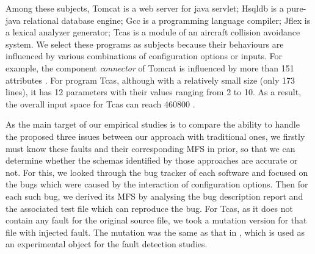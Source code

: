 \documentclass[journal,12pt,onecolumn,draftclsnofoot,]{IEEEtran}
\begin{document}
Among these subjects, Tomcat is a web server for java servlet; Hsqldb is a pure-java relational database engine; Gcc is a programming language compiler; Jflex is a lexical analyzer generator; Tcas is a module of an aircraft collision avoidance system. We select these programs as subjects because their behaviours are influenced by various combinations of configuration options or inputs. For example, the component \emph{connector} of Tomcat is influenced by more than 151 attributes \cite{tomcatconnector}. For program Tcas, although with a relatively small size (only 173 lines), it has 12 parameters with their values ranging from 2 to 10. As a result, the overall input space for Tcas can reach 460800 \cite{shakya2012isolating,kuhn2006pseudo}.


As the main target of our empirical studies is to compare the ability to handle the proposed three issues between our approach with traditional ones, we firstly must know these faults and their corresponding MFS in prior, so that we can determine whether the schemas identified by those approaches are accurate or not.  For this, we looked through the bug tracker of each software and focused on the bugs which were caused by the interaction of configuration options. Then for each such bug, we derived its MFS by analysing the bug description report and the associated test file which can reproduce the bug. For Tcas, as it does not contain any fault for the original source file, we took a mutation version for that file with injected fault. The mutation was the same as that in \cite{kuhn2006pseudo}, which is used as an experimental object for the fault detection studies.

%
%
%
%
\end{document}
